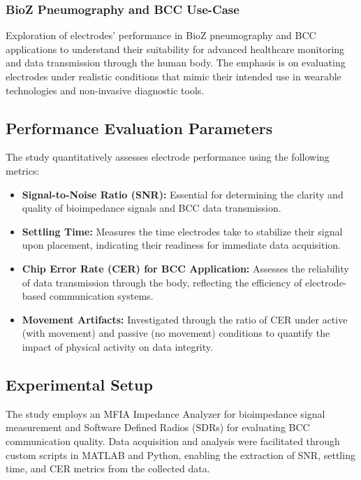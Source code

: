 \documentclass[conference]{IEEEtran}
\begin{document}
\subsubsection{BioZ Pneumography and BCC Use-Case}
Exploration of electrodes' performance in BioZ pneumography and BCC applications to understand their suitability for advanced healthcare monitoring and data transmission through the human body. The emphasis is on evaluating electrodes under realistic conditions that mimic their intended use in wearable technologies and non-invasive diagnostic tools.

\subsection{Performance Evaluation Parameters}
The study quantitatively assesses electrode performance using the following metrics:
\begin{itemize}
    \item \textbf{Signal-to-Noise Ratio (SNR):} Essential for determining the clarity and quality of bioimpedance signals and BCC data transmission.
    
    \item \textbf{Settling Time:} Measures the time electrodes take to stabilize their signal upon placement, indicating their readiness for immediate data acquisition.
    
    \item \textbf{Chip Error Rate (CER) for BCC Application:} Assesses the reliability of data transmission through the body, reflecting the efficiency of electrode-based communication systems.
    
    \item \textbf{Movement Artifacts:} Investigated through the ratio of CER under active (with movement) and passive (no movement) conditions to quantify the impact of physical activity on data integrity.
\end{itemize}

\subsection{Experimental Setup}
The study employs an MFIA Impedance Analyzer for bioimpedance signal measurement and Software Defined Radios (SDRs) for evaluating BCC communication quality. Data acquisition and analysis were facilitated through custom scripts in MATLAB and Python, enabling the extraction of SNR, settling time, and CER metrics from the collected data.
\end{document}
